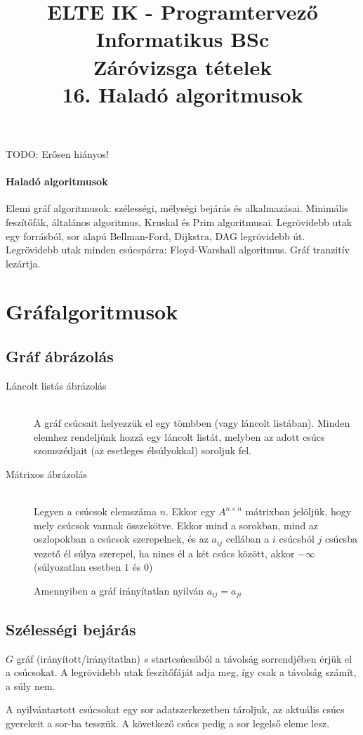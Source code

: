 \documentclass[margin=0px]{article}
\title{\textbf{{\Large ELTE IK - Programtervező Informatikus BSc} \vspace{0.2cm} \\ {\huge Záróvizsga tételek}} \vspace{0.3cm} \\ 16. Haladó algoritmusok}
\author{}
\date{}
\newenvironment{tetel}[1]{\paragraph{#1 \\}}{}
\begin{document}
\maketitle

TODO: Erősen hiányos!

\begin{tetel}{Haladó algoritmusok}
    Elemi gráf algoritmusok: szélességi, mélységi bejárás és alkalmazásai. Minimális feszítőfák, általános algoritmus, Kruskal és Prim algoritmusai. Legrövidebb utak egy forrásból, sor alapú Bellman-Ford, Dijkstra, DAG legrövidebb út. Legrövidebb utak minden csúcspárra: Floyd-Warshall algoritmus. Gráf tranzitív lezártja.
\end{tetel}

\section{Gráfalgoritmusok}
\subsection{Gráf ábrázolás}
\begin{description}
    \item[Láncolt listás ábrázolás] \hfill \\
        A gráf csúcsait helyezzük el egy tömbben (vagy láncolt listában). Minden elemhez rendeljünk hozzá egy láncolt listát, melyben az adott csúcs szomszédjait (az esetleges élsúlyokkal) soroljuk fel.
    \item[Mátrixos ábrázolás] \hfill \\
        Legyen a csúcsok elemszáma $n$. Ekkor egy $A^{n\times n}$ mátrixban jelöljük, hogy mely csúcsok vannak összekötve. Ekkor mind a sorokban, mind az oszlopokban a csúcsok szerepelnek, és az $a_{ij}$ cellában a $i$ csúcsból $j$ csúcsba vezető él súlya szerepel, ha nincs él a két csúcs között, akkor $-\infty$ (súlyozatlan esetben $1$ és $0$)

        Amennyiben a gráf irányítatlan nyilván $a_{ij} = a_{ji}$
\end{description}
\subsection{Szélességi bejárás}
$G$ gráf (irányított/irányítatlan) $s$ startcsúcsából a távolság sorrendjében érjük el a csúcsokat. A legrövidebb utak feszítőfáját adja meg, így csak a távolság számít, a súly nem.

A nyilvántartott csúcsokat egy sor adatszerkezetben tároljuk, az aktuális csúcs gyerekeit a sor-ba tesszük. A következő csúcs pedig a sor legelső eleme lesz.
\end{document}
